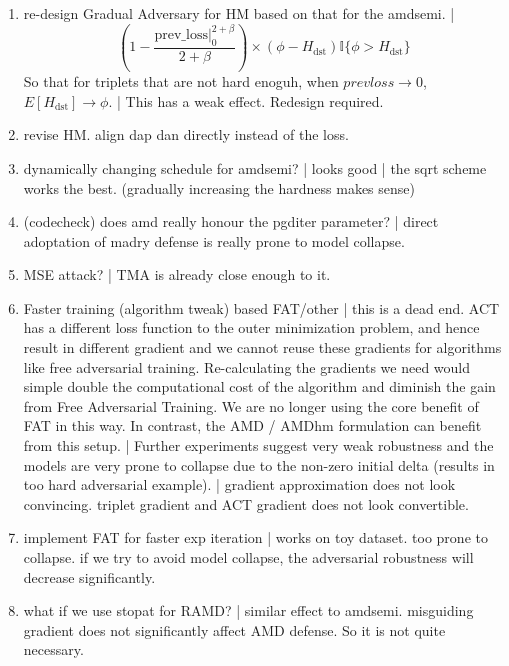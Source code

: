 \begin{enumerate}

	\item [\xmark] re-design Gradual Adversary for HM based on that for the amdsemi. |
		\[
			(1-\frac{\text{prev\_loss}|_0^{2+\beta}}{2+\beta}) \times
			(\phi - H_\text{dst})\mathbb{I}\{\phi > H_\text{dst}\}
		\]
		So that for triplets that are not hard enoguh, when
		$prevloss \rightarrow 0$, $E[H_\text{dst}]\rightarrow \phi$.
		| This has a weak effect. Redesign required.
	
	\item [\cmark] revise HM. align dap dan directly instead of the loss.

	\item [\cmark] \checkmark dynamically changing schedule for amdsemi? |
		looks good | the sqrt scheme works the best. (gradually increasing the
		hardness makes sense)

	\item [\cmark] (codecheck) does amd really honour the pgditer parameter? |
		direct adoptation of madry defense is really prone to model collapse.

	\item [\xmark] MSE attack? | TMA is already close enough to it.

	\item [\xmark] Faster training (algorithm tweak) based FAT/other | this is
		a dead end. ACT has a different loss function to the outer minimization
		problem, and hence result in different gradient and we cannot reuse
		these gradients for algorithms like free adversarial training.
		Re-calculating the gradients we need would simple double the
		computational cost of the algorithm and diminish the gain from Free
		Adversarial Training. We are no longer using the core benefit of FAT in
		this way. In contrast, the AMD / AMDhm formulation can benefit from
		this setup. | Further experiments suggest very weak robustness and the
		models are very prone to collapse due to the non-zero initial delta
		(results in too hard adversarial example).  | gradient approximation
		does not look convincing. triplet gradient and ACT gradient does not
		look convertible.

	\item [\cmark] implement FAT for faster exp iteration | works on toy
		dataset. too prone to collapse. if we try to avoid model collapse, the
		adversarial robustness will decrease significantly.

	\item [\cmark] what if we use stopat for RAMD? | similar effect to amdsemi.
		misguiding gradient does not significantly affect AMD defense. So it
		is not quite necessary.
	
\end{enumerate}
